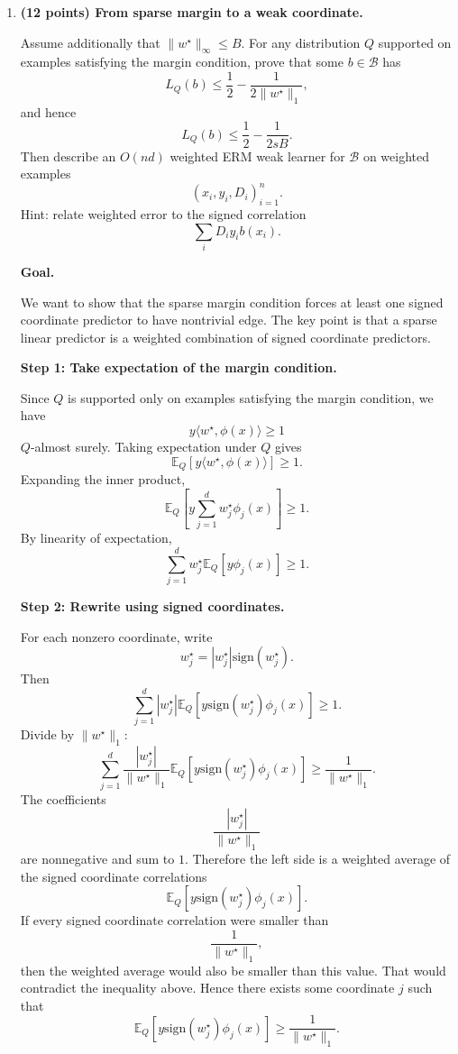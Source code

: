 \documentclass[11pt]{article}
\newcommand{\E}{\mathbb{E}}
\newcommand{\sign}{\mathrm{sign}}
\begin{document}
\begin{enumerate}
    \item \textbf{(12 points) From sparse margin to a weak coordinate.}

    Assume additionally that $\|w^\star\|_\infty\le B$. For any distribution $Q$ supported on examples satisfying the margin condition, prove that some $b\in\mathcal B$ has
    \[
    L_Q(b)\le \frac12-\frac{1}{2\|w^\star\|_1},
    \]
    and hence
    \[
    L_Q(b)\le \frac12-\frac{1}{2sB}.
    \]
    Then describe an $O(nd)$ weighted ERM weak learner for $\mathcal B$ on weighted examples
    \[
    (x_i,y_i,D_i)_{i=1}^n.
    \]
    Hint: relate weighted error to the signed correlation
    \[
    \sum_i D_i y_i b(x_i).
    \]

    \begin{solutionbox}
    \textbf{Goal.}

    We want to show that the sparse margin condition forces at least one signed coordinate
    predictor to have nontrivial edge. The key point is that a sparse linear predictor is a
    weighted combination of signed coordinate predictors.

    \medskip

    \textbf{Step 1: Take expectation of the margin condition.}

    Since $Q$ is supported only on examples satisfying the margin condition, we have
    \[
    y\langle w^\star,\phi(x)\rangle\ge 1
    \]
    $Q$-almost surely. Taking expectation under $Q$ gives
    \[
    \E_Q[y\langle w^\star,\phi(x)\rangle]\ge 1.
    \]
    Expanding the inner product,
    \[
    \E_Q\left[y\sum_{j=1}^d w_j^\star\phi_j(x)\right]\ge 1.
    \]
    By linearity of expectation,
    \[
    \sum_{j=1}^d w_j^\star \E_Q[y\phi_j(x)]\ge 1.
    \]

    \medskip

    \textbf{Step 2: Rewrite using signed coordinates.}

    For each nonzero coordinate, write
    \[
    w_j^\star=|w_j^\star|\sign(w_j^\star).
    \]
    Then
    \[
    \sum_{j=1}^d
    |w_j^\star|
    \E_Q[y\sign(w_j^\star)\phi_j(x)]
    \ge 1.
    \]
    Divide by $\|w^\star\|_1$:
    \[
    \sum_{j=1}^d
    \frac{|w_j^\star|}{\|w^\star\|_1}
    \E_Q[y\sign(w_j^\star)\phi_j(x)]
    \ge
    \frac{1}{\|w^\star\|_1}.
    \]
    The coefficients
    \[
    \frac{|w_j^\star|}{\|w^\star\|_1}
    \]
    are nonnegative and sum to $1$. Therefore the left side is a weighted average of the signed
    coordinate correlations
    \[
    \E_Q[y\sign(w_j^\star)\phi_j(x)].
    \]
    If every signed coordinate correlation were smaller than
    \[
    \frac{1}{\|w^\star\|_1},
    \]
    then the weighted average would also be smaller than this value. That would contradict the
    inequality above. Hence there exists some coordinate $j$ such that
    \[
    \E_Q[y\sign(w_j^\star)\phi_j(x)]
    \ge
    \frac{1}{\|w^\star\|_1}.
    \]


\end{solutionbox}
\end{enumerate}
\end{document}
